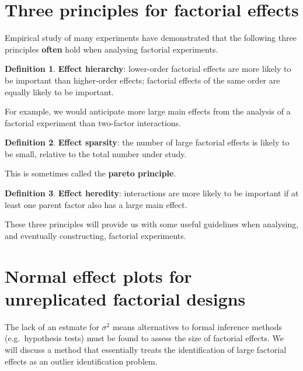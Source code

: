 \documentclass[
]{book}
\theoremstyle{definition}
\newtheorem{definition}{Definition}[chapter]
\theoremstyle{definition}
\theoremstyle{definition}
\theoremstyle{definition}
\theoremstyle{remark}
\begin{document}
\hypertarget{fact-principles}{%
\section{Three principles for factorial effects}\label{fact-principles}}

Empirical study of many experiments \citep{BoxMeyer1986, Li2006} have demonstrated that the following three principles \textbf{often} hold when analysing factorial experiments.

\begin{definition}
\protect\hypertarget{def:effect-hierarchy}{}\label{def:effect-hierarchy}\textbf{Effect hierarchy}: lower-order factorial effects are more likely to be important than higher-order effects; factorial effects of the same order are equally likely to be important.

For example, we would anticipate more large main effects from the analysis of a factorial experiment than two-factor interactions.
\end{definition}

\begin{definition}
\protect\hypertarget{def:effect-sparsity}{}\label{def:effect-sparsity}\textbf{Effect sparsity}: the number of large factorial effects is likely to be small, relative to the total number under study.

This is sometimes called the \textbf{pareto principle}.
\end{definition}

\begin{definition}
\protect\hypertarget{def:effect-heredity}{}\label{def:effect-heredity}\textbf{Effect heredity}: interactions are more likely to be important if at least one parent factor also has a large main effect.
\end{definition}

These three principles will provide us with some useful guidelines when analysing, and eventually constructing, factorial experiments.

\hypertarget{unreplicated-normal-plots}{%
\section{Normal effect plots for unreplicated factorial designs}\label{unreplicated-normal-plots}}

The lack of an estmate for \(\sigma^2\) means alternatives to formal inference methods (e.g.~hypothesis tests) must be found to assess the size of factorial effects. We will discuss a method that essentially treats the identification of large factorial effects as an outlier identification problem.
\end{document}
